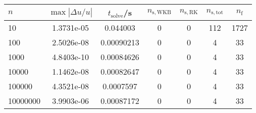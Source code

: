 \begin{tabular}{l c c c c c c}
\hline \hline 
$n$  &  $\max|\Delta u/u|$  &  $t_{\mathrm{solve}}$/\si{\s}  &  $n_{\mathrm{s,WKB}}$  &  $n_{\mathrm{s,RK}}$  &  $n_{\mathrm{s,tot}}$  &  $n_{\mathrm{f}}$ \\ \hline
10  &  1.3731e-05  &  0.044003  &  0  &  0  &  112  &  1727  \\ 
100  &  2.5026e-08  &  0.00090213  &  0  &  0  &  4  &  33  \\ 
1000  &  4.8403e-10  &  0.00084626  &  0  &  0  &  4  &  33  \\ 
10000  &  1.1462e-08  &  0.00082647  &  0  &  0  &  4  &  33  \\ 
100000  &  4.3521e-08  &  0.0007597  &  0  &  0  &  4  &  33  \\ 
10000000  &  3.9903e-06  &  0.00087172  &  0  &  0  &  4  &  33  \\ 
\end{tabular}
